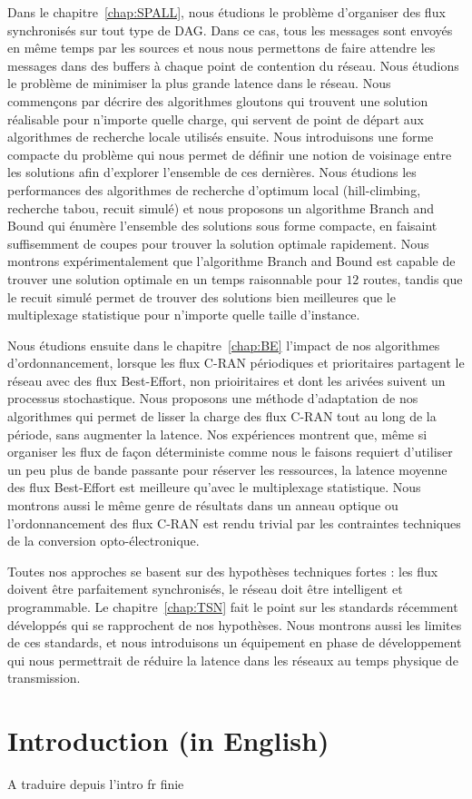 Dans le chapitre~\ref{chap:SPALL}, nous étudions le problème d'organiser des flux synchronisés sur tout type de DAG. Dans ce cas, tous les messages sont envoyés en même temps par les sources et nous nous permettons de faire attendre les messages dans des buffers à chaque point de contention du réseau. Nous étudions le problème de minimiser la plus grande latence dans le réseau. Nous commençons par décrire des algorithmes gloutons qui trouvent une solution réalisable pour n'importe quelle charge, qui servent de point de départ aux algorithmes de recherche locale utilisés ensuite. Nous introduisons une forme compacte du problème qui nous permet de définir une notion de voisinage entre les solutions afin d'explorer l'ensemble de ces dernières. Nous étudions les performances des algorithmes de recherche d'optimum local (hill-climbing, recherche tabou, recuit simulé) et nous proposons un algorithme Branch and Bound qui énumère l'ensemble des solutions sous forme compacte, en faisaint suffisemment de coupes pour trouver la solution optimale rapidement. Nous montrons expérimentalement que l'algorithme Branch and Bound est capable de trouver une solution optimale en un temps raisonnable pour $12$ routes, tandis que le recuit simulé permet de trouver des solutions bien meilleures que le multiplexage statistique pour n'importe quelle taille d'instance.

Nous étudions ensuite dans le chapitre~\ref{chap:BE} l'impact de nos algorithmes d'ordonnancement, lorsque les flux C-RAN périodiques et prioritaires partagent le réseau avec des flux Best-Effort, non prioiritaires et dont les arivées suivent un processus stochastique. Nous proposons une méthode d'adaptation de nos algorithmes qui permet de lisser la charge des flux C-RAN tout au long de la période, sans augmenter la latence. Nos expériences montrent que, même si organiser les flux de façon déterministe comme nous le faisons requiert d'utiliser un peu plus de bande passante pour réserver les ressources, la latence moyenne des flux Best-Effort est meilleure qu'avec le multiplexage statistique. Nous montrons aussi le même genre de résultats dans un anneau optique ou l'ordonnancement des flux C-RAN est rendu trivial par les contraintes techniques de la conversion opto-électronique.

Toutes nos approches se basent sur des hypothèses techniques fortes : les flux doivent être parfaitement synchronisés, le réseau doit être intelligent et programmable. Le chapitre~\ref{chap:TSN} fait le point sur les standards récemment développés qui se rapprochent de nos hypothèses. Nous montrons aussi les limites de ces standards, et nous introduisons un équipement en phase de développement qui nous permettrait de réduire la latence dans les réseaux au temps physique de transmission.




\chapter*{Introduction (in English)}
\label{chap:introen}
A traduire depuis l'intro fr finie